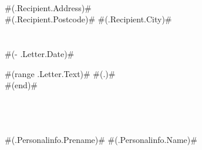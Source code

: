 \documentclass[8pt]{developercv} %
\begin{document}
\vspace{1cm}
\begin{minipage}[t]{0.33\textwidth} %
	\\
	#(.Recipient.Address)# \\
	#(.Recipient.Postcode)# #(.Recipient.City)#\\
	\\
	\\
	#(- .Letter.Date)#\\
\end{minipage}
\vspace{1cm}



#(range .Letter.Text)#
#(.)# \\
#(end)#

\begin{minipage}[t]{0.3\textwidth}
	\vspace{-\baselineskip} %

	\\
	\\
	\\
	#(.Personalinfo.Prename)# #(.Personalinfo.Name)#
\end{minipage}
\hfill

\end{document}
